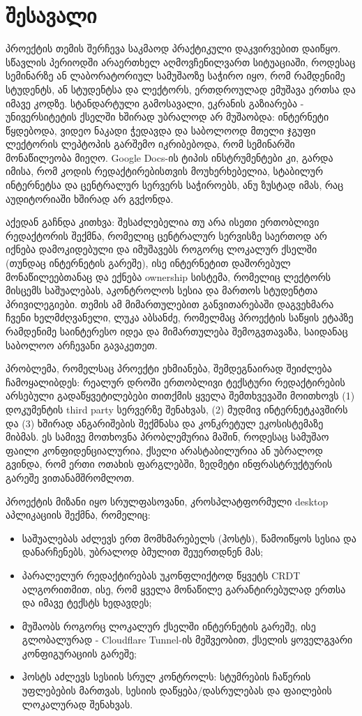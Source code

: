 \section{შესავალი}

პროექტის თემის შერჩევა საკმაოდ პრაქტიკული დაკვირვებით დაიწყო. სწავლის
პერიოდში არაერთხელ აღმოვჩენილვართ სიტუაციაში, როდესაც სემინარზე ან
ლაბორატორიულ სამუშაოზე საჭირო იყო, რომ რამდენიმე სტუდენტს, ან სტუდენტსა და ლექტორს, ერთდროულად
ემუშავა ერთსა და იმავე კოდზე. სტანდარტული გამოსავალი, ეკრანის გაზიარება -
უნივერსიტეტის ქსელში ხშირად უბრალოდ არ მუშაობდა: ინტერნეტი წყდებოდა,
ვიდეო ნაკადი ჭედავდა და საბოლოოდ მთელი ჯგუფი ლექტორის ლეპტოპის გარშემო
იკრიბებოდა, რომ სემინარში მონაწილეობა მიეღო. Google Docs-ის ტიპის
ინსტრუმენტები კი, გარდა იმისა, რომ კოდის რედაქტირებისთვის მოუხერხებელია,
სტაბილურ ინტერნეტსა და ცენტრალურ სერვერს საჭიროებს, ანუ ზუსტად იმას,
რაც აუდიტორიაში ხშირად არ გვქონდა.

აქედან გაჩნდა კითხვა: შესაძლებელია თუ არა ისეთი ერთობლივი რედაქტორის
შექმნა, რომელიც ცენტრალურ სერვისზე საერთოდ არ იქნება დამოკიდებული და
იმუშავებს როგორც ლოკალურ ქსელში (თუნდაც ინტერნეტის გარეშე), ისე
ინტერნეტით დაშორებულ მონაწილეებთანაც და ექნება ownership სისტემა, 
რომელიც ლექტორს მისცემს საშუალებას, აკონტროლოს სესია და მართოს სტუდენტთა პრივილეგიები.
თემის ამ მიმართულებით განვითარებაში
დაგვეხმარა ჩვენი ხელმძღვანელი, ლუკა აბსანძე, რომელმაც პროექტის საწყის
ეტაპზე რამდენიმე საინტერესო იდეა და მიმართულება შემოგვთავაზა, საიდანაც
საბოლოო არჩევანი გავაკეთეთ.

პრობლემა, რომელსაც პროექტი ეხმიანება, შემდეგნაირად შეიძლება ჩამოყალიბდეს:
რეალურ დროში ერთობლივი ტექსტური რედაქტირების არსებული გადაწყვეტილებები
თითქმის ყველა შემთხვევაში მოითხოვს (1) დოკუმენტის third party სერვერზე
შენახვას, (2) მუდმივ ინტერნეტკავშირს და (3) ხშირად ანგარიშების შექმნასა და
კონკრეტულ ეკოსისტემაზე მიბმას. ეს სამივე მოთხოვნა პრობლემურია მაშინ,
როდესაც სამუშაო ფაილი კონფიდენციალურია, ქსელი არასტაბილურია ან უბრალოდ
გვინდა, რომ ერთი ოთახის ფარგლებში, ზედმეტი ინფრასტრუქტურის გარეშე
ვითანამშრომლოთ.

პროექტის მიზანი იყო სრულფასოვანი, კროსპლატფორმული desktop აპლიკაციის
შექმნა, რომელიც:
\begin{itemize}[itemsep=0pt]
  \item საშუალებას აძლევს ერთ მომხმარებელს (ჰოსტს), წამოიწყოს სესია და
        დანარჩენებს, უბრალოდ ბმულით შეუერთდნენ მას;
  \item პარალელურ რედაქტირებას უკონფლიქტოდ წყვეტს CRDT ალგორითმით, ისე,
        რომ ყველა მონაწილე გარანტირებულად ერთსა და იმავე ტექსტს ხედავდეს;
  \item მუშაობს როგორც ლოკალურ ქსელში ინტერნეტის გარეშე, ისე გლობალურად -
        Cloudflare Tunnel-ის მეშვეობით, ქსელის ყოველგვარი კონფიგურაციის
        გარეშე;
  \item ჰოსტს აძლევს სესიის სრულ კონტროლს: სტუმრების ჩაწერის უფლებების
        მართვას, სესიის დაწყება/დასრულებას და ფაილების ლოკალურად შენახვას.
\end{itemize}

